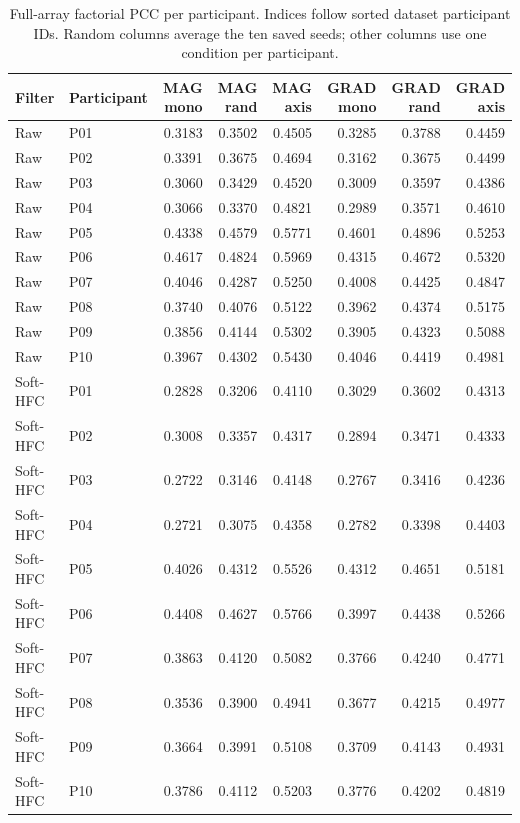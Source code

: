 \begin{table}[htbp]\centering\small
\begin{tabular}{llrrrrrr}
\toprule
Filter & Participant & MAG mono & MAG rand & MAG axis & GRAD mono & GRAD rand & GRAD axis \\
\midrule
Raw & P01 & 0.3183 & 0.3502 & 0.4505 & 0.3285 & 0.3788 & 0.4459 \\
Raw & P02 & 0.3391 & 0.3675 & 0.4694 & 0.3162 & 0.3675 & 0.4499 \\
Raw & P03 & 0.3060 & 0.3429 & 0.4520 & 0.3009 & 0.3597 & 0.4386 \\
Raw & P04 & 0.3066 & 0.3370 & 0.4821 & 0.2989 & 0.3571 & 0.4610 \\
Raw & P05 & 0.4338 & 0.4579 & 0.5771 & 0.4601 & 0.4896 & 0.5253 \\
Raw & P06 & 0.4617 & 0.4824 & 0.5969 & 0.4315 & 0.4672 & 0.5320 \\
Raw & P07 & 0.4046 & 0.4287 & 0.5250 & 0.4008 & 0.4425 & 0.4847 \\
Raw & P08 & 0.3740 & 0.4076 & 0.5122 & 0.3962 & 0.4374 & 0.5175 \\
Raw & P09 & 0.3856 & 0.4144 & 0.5302 & 0.3905 & 0.4323 & 0.5088 \\
Raw & P10 & 0.3967 & 0.4302 & 0.5430 & 0.4046 & 0.4419 & 0.4981 \\
Soft-HFC & P01 & 0.2828 & 0.3206 & 0.4110 & 0.3029 & 0.3602 & 0.4313 \\
Soft-HFC & P02 & 0.3008 & 0.3357 & 0.4317 & 0.2894 & 0.3471 & 0.4333 \\
Soft-HFC & P03 & 0.2722 & 0.3146 & 0.4148 & 0.2767 & 0.3416 & 0.4236 \\
Soft-HFC & P04 & 0.2721 & 0.3075 & 0.4358 & 0.2782 & 0.3398 & 0.4403 \\
Soft-HFC & P05 & 0.4026 & 0.4312 & 0.5526 & 0.4312 & 0.4651 & 0.5181 \\
Soft-HFC & P06 & 0.4408 & 0.4627 & 0.5766 & 0.3997 & 0.4438 & 0.5266 \\
Soft-HFC & P07 & 0.3863 & 0.4120 & 0.5082 & 0.3766 & 0.4240 & 0.4771 \\
Soft-HFC & P08 & 0.3536 & 0.3900 & 0.4941 & 0.3677 & 0.4215 & 0.4977 \\
Soft-HFC & P09 & 0.3664 & 0.3991 & 0.5108 & 0.3709 & 0.4143 & 0.4931 \\
Soft-HFC & P10 & 0.3786 & 0.4112 & 0.5203 & 0.3776 & 0.4202 & 0.4819 \\
\bottomrule\end{tabular}
\caption{Full-array factorial PCC per participant. Indices follow sorted dataset participant IDs. Random columns average the ten saved seeds; other columns use one condition per participant.}
\label{tab:s-factorial-participants}\end{table}

